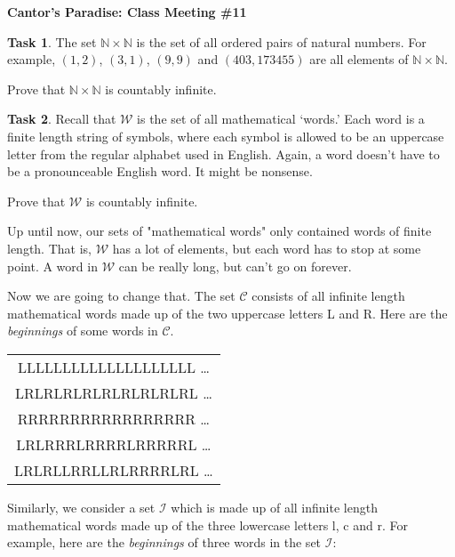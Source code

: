 \documentclass[12pt]{amsart}
\theoremstyle{definition}
\newtheorem{task}{Task}
\begin{document}
\begin{center}
\textbf{\Huge
Cantor's Paradise: Class Meeting \#11
}
\end{center}

\vspace{.5in}

\begin{task}
The set $\mathbb{N}\times\mathbb{N}$ is the set of all ordered pairs of natural numbers. For example, $(1,2)$, $(3,1)$, $(9,9)$ and $(403, 173455)$ are all elements of $\mathbb{N}\times\mathbb{N}$.

Prove that $\mathbb{N}\times\mathbb{N}$ is countably infinite.
\end{task}

\begin{task} Recall that $\mathcal{W}$ is the set of all mathematical `words.'
Each word is a finite length string of symbols, where each symbol is allowed to be an uppercase letter from the regular alphabet used in English.
Again, a word doesn't have to be a pronounceable English word.
It might be nonsense.

Prove that $\mathcal{W}$ is countably infinite.
\end{task}

\hrulefill
\vspace{0.5in}

Up until now, our sets of "mathematical words" only contained words of finite length. That is, $\mathcal{W}$ has a lot of elements, but each word has to stop at some point. A word in $\mathcal{W}$ can be really long, but can't go on forever.

Now we are going to change that. The set $\mathcal{C}$ consists of all infinite length mathematical words made up of the two uppercase letters L and R. Here are the \emph{beginnings} of some words in $\mathcal{C}$.

\begin{center}
\begin{tabular}{c}
LLLLLLLLLLLLLLLLLLLL \dots \\[.2cm]
LRLRLRLRLRLRLRLRLRL \dots \\[.2cm]
RRRRRRRRRRRRRRRRR \dots \\[.2cm]
LRLRRRLRRRRLRRRRRL \dots \\[.2cm]
LRLRLLRRLLRLRRRRLRL \dots\\[.5cm]
\end{tabular}
\end{center}
Similarly, we consider a set $\mathcal{I}$ which is made up of all infinite length mathematical words made up of the three lowercase letters l, c and r. For example, here are the \emph{beginnings} of three words in the set $\mathcal{I}$:
\end{document}
